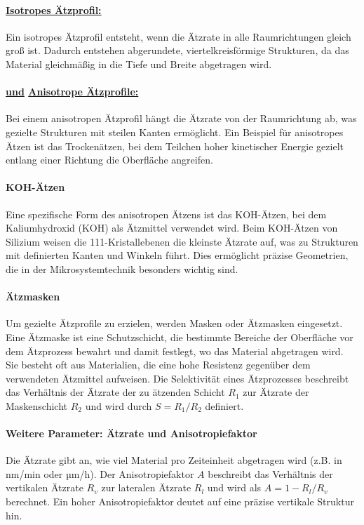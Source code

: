 \documentclass{article} %
\newcommand*\circled[1]{\tikz[baseline=(char.base)]{\node[shape=circle, draw, inner sep=1pt, text height=1.5ex, text depth=.25ex] (char) {#1};}}
\begin{document}
\paragraph{\protect\circled{1} \uline{Isotropes Ätzprofil:}} Ein isotropes Ätzprofil entsteht, wenn die Ätzrate in alle Raumrichtungen gleich groß ist. Dadurch entstehen abgerundete, viertelkreisförmige Strukturen, da das Material gleichmäßig in die Tiefe und Breite abgetragen wird.

\paragraph{\protect\circled{2} \uline{und} \protect\circled{3} \uline{Anisotrope Ätzprofile:}} Bei einem anisotropen Ätzprofil hängt die Ätzrate von der Raumrichtung ab, was gezielte Strukturen mit steilen Kanten ermöglicht. Ein Beispiel für anisotropes Ätzen ist das Trockenätzen, bei dem Teilchen hoher kinetischer Energie gezielt entlang einer Richtung die Oberfläche angreifen.

\paragraph{KOH-Ätzen} Eine spezifische Form des anisotropen Ätzens ist das KOH-Ätzen, bei dem Kaliumhydroxid (KOH) als Ätzmittel verwendet wird. Beim KOH-Ätzen von Silizium weisen die {111}-Kristallebenen die kleinste Ätzrate auf, was zu Strukturen mit definierten Kanten und Winkeln führt. Dies ermöglicht präzise Geometrien, die in der Mikrosystemtechnik besonders wichtig sind.

\paragraph{Ätzmasken} Um gezielte Ätzprofile zu erzielen, werden Masken oder Ätzmasken eingesetzt. Eine Ätzmaske ist eine Schutzschicht, die bestimmte Bereiche der Oberfläche vor dem Ätzprozess bewahrt und damit festlegt, wo das Material abgetragen wird. Sie besteht oft aus Materialien, die eine hohe Resistenz gegenüber dem verwendeten Ätzmittel aufweisen. Die Selektivität eines Ätzprozesses beschreibt das Verhältnis der Ätzrate der zu ätzenden Schicht $R_1$ zur Ätzrate der Maskenschicht $R_2$ und wird durch $S = R_1 / R_2$ definiert.

\paragraph{Weitere Parameter: Ätzrate und Anisotropiefaktor} Die Ätzrate gibt an, wie viel Material pro Zeiteinheit abgetragen wird (z.B. in nm/min oder µm/h). Der Anisotropiefaktor $A$ beschreibt das Verhältnis der vertikalen Ätzrate $R_v$ zur lateralen Ätzrate $R_l$ und wird als $A = 1 - R_l/R_v$ berechnet. Ein hoher Anisotropiefaktor deutet auf eine präzise vertikale Struktur hin.
\end{document}
